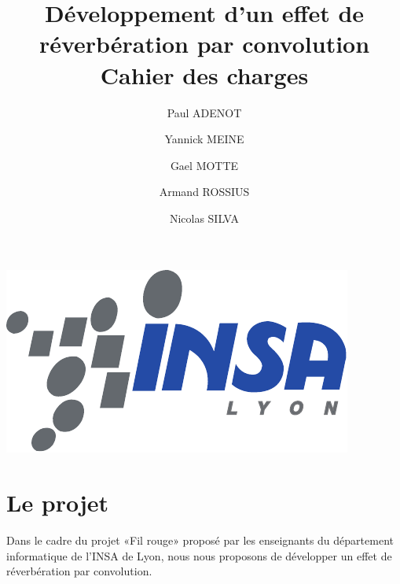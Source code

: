 

\author{Paul ADENOT \and Yannick MEINE \and Gael MOTTE \and Armand ROSSIUS \and Nicolas SILVA }
\title{Développement d'un effet de réverbération par convolution\\Cahier des charges}

\maketitle
\tableofcontents
\vspace{2cm}
\begin{center}
    \includegraphics{insalogo.pdf}
\end{center}
\newpage
\section{Le projet}
Dans le cadre du projet «Fil rouge» proposé par les enseignants du département informatique de l'INSA de Lyon, nous nous proposons de développer un effet de réverbération par convolution.

